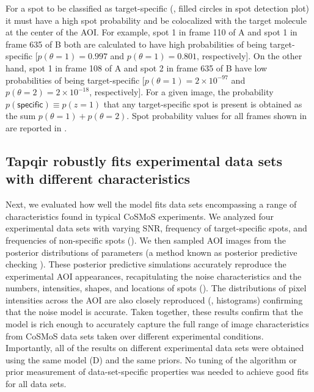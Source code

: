 For a spot to be classified as target-specific (, filled circles in spot detection plot) it must have a high spot probability and be colocalized with the target molecule at the center of the AOI. For example, spot 1 in frame 110 of A and spot 1 in frame 635 of B both are calculated to have high probabilities of being target-specific [$p(\theta=1) = 0.997$ and $p(\theta=1) = 0.801$, respectively]. On the other hand, spot 1 in frame 108 of A and spot 2 in frame 635 of B have low probabilities of being target-specific [$p(\theta=1) = 2 \times 10^{-97}$ and $p(\theta=2) = 2 \times 10^{-18}$, respectively]. For a given image, the probability $p(\mathsf{specific}) \equiv p(z=1)$ that any target-specific spot is present is obtained as the sum $p(\theta=1) + p(\theta=2)$. Spot probability values for all frames shown in  are reported in .  



\subsection{Tapqir robustly fits experimental data sets with different characteristics}

Next, we evaluated how well the model fits data sets encompassing a range of characteristics found in typical CoSMoS experiments. We analyzed four experimental data sets with varying SNR, frequency of target-specific spots, and frequencies of non-specific spots (). We then sampled AOI images from the posterior distributions of parameters (a method known as posterior predictive checking \citep{Gelman2013-ro}). These posterior predictive simulations accurately reproduce the experimental AOI appearances, recapitulating the noise characteristics and the numbers, intensities, shapes, and locations of spots ().  The distributions of pixel intensities across the AOI are also closely reproduced (, histograms) confirming that the noise model is accurate. Taken together, these results confirm that the model is rich enough to accurately capture the full range of image characteristics from CoSMoS data sets taken over different experimental conditions.  Importantly, all of the results on different experimental data sets were obtained using the same model (D) and the same priors.  No tuning of the algorithm or prior measurement of data-set-specific properties was needed to achieve good fits for all data sets.

